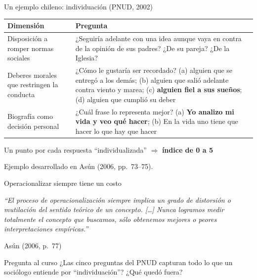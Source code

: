 \documentclass[aspectratio=169,11pt]{beamer}
\newcommand{\hl}[1]{\textcolor{marino}{\textbf{#1}}}        %
\newcommand{\fuente}[1]{\par\vfill{\scriptsize\color{gris}#1\par}}
\begin{document}
\begin{frame}{Un ejemplo chileno: individuación (PNUD, 2002)}
\begin{center}
\small
\begin{tabular}{>{\raggedright}p{}p{}}
\toprule
\textbf{Dimensión} & \textbf{Pregunta} \\
\midrule
\rowcolor{crema}
Disposición a romper normas sociales & ¿Seguiría adelante con una idea aunque vaya en contra de la opinión de sus padres? ¿De su pareja? ¿De la Iglesia? \\
Deberes morales que restringen la conducta & ¿Cómo le gustaría ser recordado? (a) alguien que se entregó a los demás; (b) alguien que salió adelante contra viento y marea; (c) \textbf{alguien fiel a sus sueños}; (d) alguien que cumplió su deber \\
\rowcolor{crema}
Biografía como decisión personal & ¿Cuál frase lo representa mejor? (a) \textbf{Yo analizo mi vida y veo qué hacer}; (b) En la vida uno tiene que hacer lo que hay que hacer \\
\bottomrule
\end{tabular}
\end{center}
\medskip
Un punto por cada respuesta ``individualizada'' $\Rightarrow$ \hl{índice de 0 a 5}
\fuente{Ejemplo desarrollado en Asún (2006, pp.~73--75).}
\end{frame}

\begin{frame}{Operacionalizar siempre tiene un costo}
\vfill
\begin{center}
\begin{minipage}{0.82\textwidth}
\large\itshape
``El proceso de operacionalización siempre implica un grado de distorsión o mutilación del sentido teórico de un concepto. [\ldots] Nunca logramos medir totalmente el concepto que buscamos, sólo obtenemos mejores o peores interpretaciones empíricas.''
\end{minipage}
\end{center}
\begin{flushright}\small Asún (2006, p.~77)\end{flushright}
\bigskip
\begin{block}{Pregunta al curso}
\small
¿Las cinco preguntas del PNUD capturan todo lo que un sociólogo entiende por ``individuación''? ¿Qué quedó fuera?
\end{block}
\vfill
\end{frame}
\end{document}
